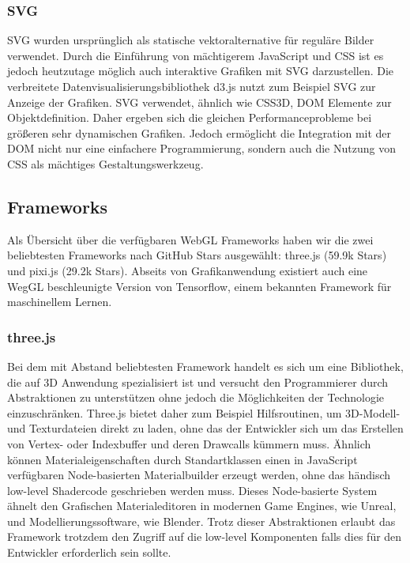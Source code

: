 \subsubsection*{\ac{SVG}}
\ac{SVG} wurden ursprünglich als statische vektoralternative für reguläre Bilder verwendet. Durch die Einführung von mächtigerem JavaScript und CSS ist es jedoch heutzutage möglich auch interaktive Grafiken mit SVG darzustellen. Die verbreitete Datenvisualisierungsbibliothek d3.js nutzt zum Beispiel SVG zur Anzeige der Grafiken. SVG verwendet, ähnlich wie CSS3D, \ac{DOM} Elemente zur Objektdefinition. Daher ergeben sich die gleichen Performanceprobleme bei größeren \bzw sehr dynamischen Grafiken. Jedoch ermöglicht die Integration mit der \ac{DOM} nicht nur eine einfachere Programmierung, sondern auch die Nutzung von CSS als mächtiges Gestaltungswerkzeug.
\subsection{Frameworks}
Als Übersicht über die verfügbaren WebGL Frameworks haben wir die zwei beliebtesten Frameworks nach GitHub Stars ausgewählt: three.js (59.9k Stars) und pixi.js (29.2k Stars). Abseits von Grafikanwendung existiert auch eine WegGL beschleunigte Version von Tensorflow, einem bekannten Framework für maschinellem Lernen.
\subsubsection*{three.js} Bei dem mit Abstand beliebtesten Framework handelt es sich um eine Bibliothek, die auf 3D Anwendung spezialisiert ist und versucht den Programmierer durch Abstraktionen zu unterstützen ohne jedoch die Möglichkeiten der Technologie einzuschränken. Three.js bietet daher zum Beispiel Hilfsroutinen, um 3D-Modell- und Texturdateien direkt zu laden, ohne das der Entwickler sich um das Erstellen von Vertex- oder Indexbuffer und deren Drawcalls kümmern muss. Ähnlich können Materialeigenschaften durch Standartklassen \bzw einen in JavaScript verfügbaren Node-basierten Materialbuilder erzeugt werden, ohne das händisch low-level Shadercode geschrieben werden muss. Dieses Node-basierte System ähnelt den Grafischen Materialeditoren in modernen Game Engines, wie \zb Unreal, und Modellierungssoftware, wie \zb Blender. Trotz dieser Abstraktionen erlaubt das Framework trotzdem den Zugriff auf die low-level Komponenten falls dies für den Entwickler erforderlich sein sollte.
